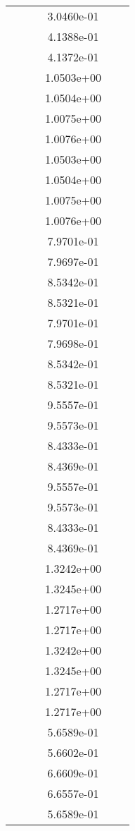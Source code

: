 \begin{xltabular}{\textwidth}{r|rS[table-format=1.3e+2]S[table-format=1.4e+2]S[table-format=1.4e+2]S[table-format=-1.5]}
&  &  & 3.0460e-01 & & \\
&  &  & 4.1388e-01 & & \\
&  &  & 4.1372e-01 & & \\
&  &  & 1.0503e+00 & & \\
&  &  & 1.0504e+00 & & \\
&  &  & 1.0075e+00 & & \\
&  &  & 1.0076e+00 & & \\
&  &  & 1.0503e+00 & & \\
&  &  & 1.0504e+00 & & \\
&  &  & 1.0075e+00 & & \\
&  &  & 1.0076e+00 & & \\
&  &  & 7.9701e-01 & & \\
&  &  & 7.9697e-01 & & \\
&  &  & 8.5342e-01 & & \\
&  &  & 8.5321e-01 & & \\
&  &  & 7.9701e-01 & & \\
&  &  & 7.9698e-01 & & \\
&  &  & 8.5342e-01 & & \\
&  &  & 8.5321e-01 & & \\
&  &  & 9.5557e-01 & & \\
&  &  & 9.5573e-01 & & \\
&  &  & 8.4333e-01 & & \\
&  &  & 8.4369e-01 & & \\
&  &  & 9.5557e-01 & & \\
&  &  & 9.5573e-01 & & \\
&  &  & 8.4333e-01 & & \\
&  &  & 8.4369e-01 & & \\
&  &  & 1.3242e+00 & & \\
&  &  & 1.3245e+00 & & \\
&  &  & 1.2717e+00 & & \\
&  &  & 1.2717e+00 & & \\
&  &  & 1.3242e+00 & & \\
&  &  & 1.3245e+00 & & \\
&  &  & 1.2717e+00 & & \\
&  &  & 1.2717e+00 & & \\
&  &  & 5.6589e-01 & & \\
&  &  & 5.6602e-01 & & \\
&  &  & 6.6609e-01 & & \\
&  &  & 6.6557e-01 & & \\
&  &  & 5.6589e-01 & & \\

\end{xltabular}
